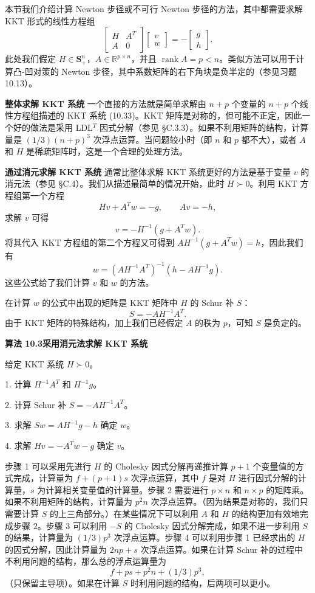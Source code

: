 \documentclass[UTF8, 12pt, fontset=fandol, oneside]{ctexart}
\begin{document}
本节我们介绍计算 Newton 步径或不可行 Newton 步径的方法，其中都需要求解 KKT 形式的线性方程组
\begin{equation}
\begin{bmatrix}
H&A^T\\
A&0
\end{bmatrix}
\begin{bmatrix}
v\\
w
\end{bmatrix}
=-
\begin{bmatrix}
g\\
h
\end{bmatrix}.
\tag{10.33}
\end{equation}
此处我们假定 $H\in\mathbf{S}_+^n$，$A\in\mathbb{R}^{p\times n}$，并且 $\operatorname{rank}A=p<n$。类似方法可以用于计算凸-凹对策的 Newton 步径，其中系数矩阵的右下角块是负半定的（参见习题 10.13）。

\noindent\textbf{整体求解 KKT 系统}\quad
一个直接的方法就是简单求解由 $n+p$ 个变量的 $n+p$ 个线性方程组描述的 KKT 系统 (10.33)。KKT 矩阵是对称的，但可能不正定，因此一个好的做法是采用 LDL$^T$ 因式分解（参见 \S C.3.3）。如果不利用矩阵的结构，计算量是 $(1/3)(n+p)^3$ 次浮点运算。当问题较小时（即 $n$ 和 $p$ 都不大），或者 $A$ 和 $H$ 是稀疏矩阵时，这是一个合理的处理方法。

\noindent\textbf{通过消元求解 KKT 系统}\quad
通常比整体求解 KKT 系统更好的方法是基于变量 $v$ 的消元法（参见 \S C.4）。我们从描述最简单的情况开始，此时 $H\succ 0$。利用 KKT 方程组第一个方程
\[
Hv+A^Tw=-g,\qquad Av=-h,
\]
求解 $v$ 可得
\[
v=-H^{-1}(g+A^Tw).
\]
将其代入 KKT 方程组的第二个方程又可得到 $AH^{-1}(g+A^Tw)=h$，因此我们有
\[
w=(AH^{-1}A^T)^{-1}(h-AH^{-1}g).
\]
这些公式给了我们计算 $v$ 和 $w$ 的方法。

在计算 $w$ 的公式中出现的矩阵是 KKT 矩阵中 $H$ 的 Schur 补 $S$：
\[
S=-AH^{-1}A^T.
\]
由于 KKT 矩阵的特殊结构，加上我们已经假定 $A$ 的秩为 $p$，可知 $S$ 是负定的。

\noindent\textbf{算法 10.3\quad 采用消元法求解 KKT 系统}

给定 KKT 系统 $H\succ0$。

1. 计算 $H^{-1}A^T$ 和 $H^{-1}g$。

2. 计算 Schur 补 $S=-AH^{-1}A^T$。

3. 求解 $Sw=AH^{-1}g-h$ 确定 $w$。

4. 求解 $Hv=-A^Tw-g$ 确定 $v$。

步骤 1 可以采用先进行 $H$ 的 Cholesky 因式分解再递推计算 $p+1$ 个变量值的方式完成，计算量为 $f+(p+1)s$ 次浮点运算，其中 $f$ 是对 $H$ 进行因式分解的计算量，$s$ 为计算相关变量值的计算量。步骤 2 需要进行 $p\times n$ 和 $n\times p$ 的矩阵乘。如果不利用矩阵的结构，计算量为 $p^2n$ 次浮点运算。（因为结果是对称的，我们只需要计算 $S$ 的上三角部分。）在某些情况下可以利用 $A$ 和 $H$ 的结构更加有效地完成步骤 2。步骤 3 可以利用 $-S$ 的 Cholesky 因式分解完成，如果不进一步利用 $S$ 的结果，计算量为 $(1/3)p^3$ 次浮点运算。步骤 4 可以利用步骤 1 已经求出的 $H$ 的因式分解，因此计算量为 $2np+s$ 次浮点运算。如果在计算 Schur 补的过程中不利用问题的结构，那么总的浮点运算量为
\[
f+ps+p^2n+(1/3)p^3,
\]
（只保留主导项）。如果在计算 $S$ 时利用问题的结构，后两项可以更小。
\end{document}
